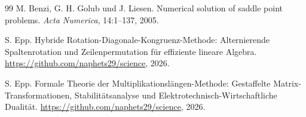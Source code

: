 \documentclass[a4paper,12pt]{article}
\theoremstyle{definition}
\begin{document}
\begin{thebibliography}{99}
M. Benzi, G. H. Golub und J. Liesen. Numerical solution of saddle point problems. \textit{Acta Numerica}, 14:1--137, 2005.

S. Epp. Hybride Rotation-Diagonale-Kongruenz-Methode: Alternierende Spaltenrotation und Zeilenpermutation für effiziente lineare Algebra. \url{https://github.com/naphets29/science}, 2026.

S. Epp. Formale Theorie der Multiplikationslängen-Methode: Gestaffelte Matrix-Transformationen, Stabilitätsanalyse und Elektrotechnisch-Wirtschaftliche Dualität. \url{https://github.com/naphets29/science}, 2026.

\end{thebibliography}
\end{document}
